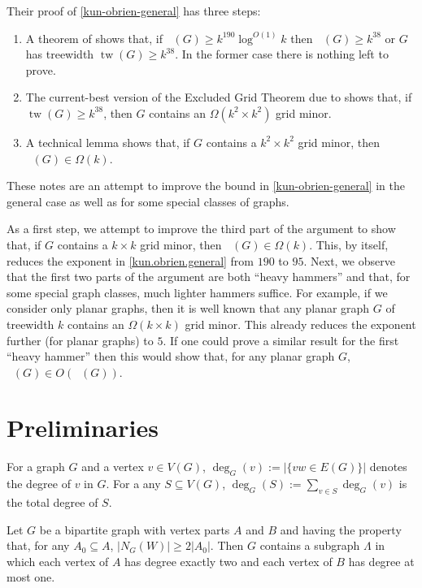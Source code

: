 \documentclass{patmorin}
\DeclareMathOperator{\tw}{tw}
\DeclareMathOperator{\chicen}{\chi_{\mathrm{cen}}}
\DeclareMathOperator{\chilin}{\chi_{\mathrm{lin}}}
\begin{document}
Their proof of \cref{kun-obrien-general} has three steps:
\begin{enumerate}
  \item A theorem of \citet{kawarabayashi.rossman:polynomial} shows that, if $\chicen(G)\ge k^{190}\log^{O(1)} k$ then $\chilin(G)\ge k^{38}$ or $G$ has treewidth $\tw(G)\ge k^{38}$.  In the former case there is nothing left to prove.
  \item The current-best version of the Excluded Grid Theorem due to \citet{chuzhoy:improved} shows that, if $\tw(G)\ge k^{38}$, then $G$ contains an $\Omega(k^2\times k^2)$ grid minor.
  \item A technical lemma \cite[Lemma~5]{kun.obrien.ea:polynomial} shows that, if $G$ contains a $k^2\times k^2$ grid minor, then $\chilin(G)\in\Omega(k)$.
\end{enumerate}

These notes are an attempt to improve the bound in \cref{kun-obrien-general} in the general case as well as for some special classes of graphs.

As a first step, we attempt to improve the third part of the argument to show that, if $G$ contains a $k\times k$ grid minor, then $\chilin(G)\in \Omega(k)$.  This, by itself, reduces the exponent in \cref{kun.obrien.general} from $190$ to $95$.  Next, we observe that the first two parts of the argument are both ``heavy hammers'' and that, for some special graph classes, much lighter hammers suffice.  For example, if we consider only planar graphs, then it is well known that any planar graph $G$ of treewidth $k$ contains an $\Omega(k\times k)$ grid minor.  This already reduces the exponent further (for planar graphs) to $5$.  If one could prove a similar result for the first ``heavy hammer'' then this would show that, for any planar graph $G$, $\chicen(G)\in O(\chilin(G))$.


\section{Preliminaries}

For a graph $G$ and a vertex $v\in V(G)$, $\deg_G(v):=|\{vw\in E(G)\}|$ denotes the degree of $v$ in $G$.  For a any $S\subseteq V(G)$, $\deg_G(S):=\sum_{v\in S}\deg_G(v)$ is the total degree of $S$.

\begin{lem}\label{hall_vees}
  Let $G$ be a bipartite graph with vertex parts $A$ and $B$ and having the property that, for any $A_0\subseteq A$, $|N_G(W)|\ge 2|A_0|$.  Then $G$ contains a subgraph $\Lambda$ in which each vertex of $A$ has degree exactly two and each vertex of $B$ has degree at most one.
\end{lem}
\end{document}
